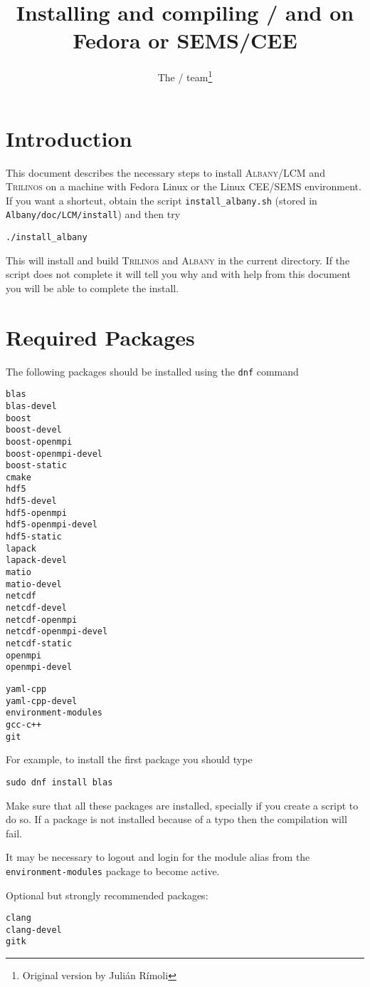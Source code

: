 \documentclass{article}
\title{Installing and compiling \albany{}/\lcm{} and
  \trilinos{} on Fedora or SEMS/CEE}
\author{The \albany{}/\lcm{} team\thanks{Original version by Juli\'an
    R\'imoli}}
\newcommand{\trilinos}{\textsc{Trilinos}}
\newcommand{\albany}{\textsc{Albany}}
\newcommand{\lcm}{\textsc{LCM}}
\begin{document}
\maketitle

\section{Introduction}
This document describes the necessary steps to install \albany{}/\lcm{} and
\trilinos{} on a machine with Fedora Linux or the Linux CEE/SEMS environment. If
you want a shortcut, obtain the script \verb+install_albany.sh+ (stored in
\verb+Albany/doc/LCM/install+) and then try
\begin{verbatim}
./install_albany
\end{verbatim}
This will install and build \trilinos{} and \albany{} in the current directory.
If the script does not complete it will tell you why and with help from this
document you will be able to complete the install.

\section{Required Packages}
The following packages should be installed using the {\tt dnf} command
\begin{verbatim}
blas
blas-devel
boost
boost-devel
boost-openmpi
boost-openmpi-devel
boost-static
cmake
hdf5
hdf5-devel
hdf5-openmpi
hdf5-openmpi-devel
hdf5-static
lapack
lapack-devel
matio
matio-devel
netcdf
netcdf-devel
netcdf-openmpi
netcdf-openmpi-devel
netcdf-static
openmpi
openmpi-devel
\end{verbatim}

\begin{verbatim}
yaml-cpp
yaml-cpp-devel
environment-modules
gcc-c++
git
\end{verbatim}

For example, to install the first package you should type
\begin{verbatim}
sudo dnf install blas
\end{verbatim}

Make sure that all these packages are installed, specially if you
create a script to do so. If a package is not installed because of a
typo then the compilation will fail.

It may be necessary to logout and login for the module alias from the
\verb+environment-modules+ package to become active.

Optional but strongly recommended packages:
\begin{verbatim}
clang
clang-devel
gitk
\end{verbatim}
\end{document}

